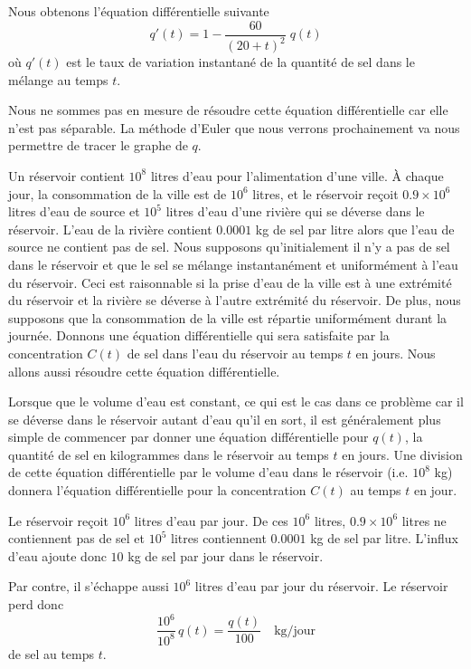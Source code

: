 {\begin{egg}[\eng]
Nous obtenons l'équation différentielle suivante
\[
q'(t) = 1 - \frac{60}{(20+t)^2} \; q(t)
\]
où $q'(t)$ est le taux de variation instantané de la quantité de sel
dans le mélange au temps $t$.

Nous ne sommes pas en mesure de résoudre cette équation différentielle car
elle n'est pas séparable.  La méthode d'Euler que nous verrons
prochainement va nous permettre de tracer le graphe de $q$.
\label{saumure}
\end{egg}

\begin{egg}[\eng]
Un réservoir contient $10^8$ litres d'eau pour l'alimentation d'une
ville.  À chaque jour, la consommation de la ville est de $10^6$
litres, et le réservoir reçoit $0.9\times 10^6$ litres d'eau de source
et $10^5$ litres d'eau d'une rivière qui se déverse dans le réservoir.
L'eau de la rivière contient $0.0001$ kg de sel par litre alors que
l'eau de source ne contient pas de sel.  Nous supposons qu'initialement il
n'y a pas de sel dans le réservoir et que le sel se mélange
instantanément et uniformément à l'eau du réservoir. Ceci est
raisonnable si la prise d'eau de la ville est à une extrémité du
réservoir et la rivière se déverse à l'autre extrémité du réservoir.
De plus, nous supposons que la consommation de la ville est répartie
uniformément durant la journée.  Donnons une équation
différentielle qui sera satisfaite par la concentration $C(t)$ de sel
dans l'eau du réservoir au temps $t$ en jours.  Nous allons aussi résoudre
cette équation différentielle.

Lorsque que le volume d'eau est constant, ce qui est le cas dans ce
problème car il se déverse dans le réservoir autant d'eau qu'il en
sort, il est généralement plus simple de commencer par donner une
équation différentielle pour $q(t)$, la quantité de sel en kilogrammes
dans le réservoir au temps $t$ en jours.  Une division de cette
équation différentielle par le volume d'eau dans le réservoir
(i.e. $10^8$ kg) donnera l'équation différentielle pour la
concentration $C(t)$ au temps $t$ en jour.

Le réservoir reçoit $10^6$ litres d'eau par jour.  De ces $10^6$
litres, $0.9 \times 10^6$ litres ne contiennent pas de sel et $10^5$
litres contiennent $0.0001$ kg de sel par litre.  L'influx d'eau
ajoute donc $10$ kg de sel par jour dans le réservoir.

Par contre, il s'échappe aussi $10^6$ litres d'eau par jour du
réservoir.  Le réservoir perd donc
\[
\frac{10^6}{10^8}\,q(t) = \frac{q(t)}{100} \quad \text{kg/jour}
\]
de sel au temps $t$.


\end{egg}}
